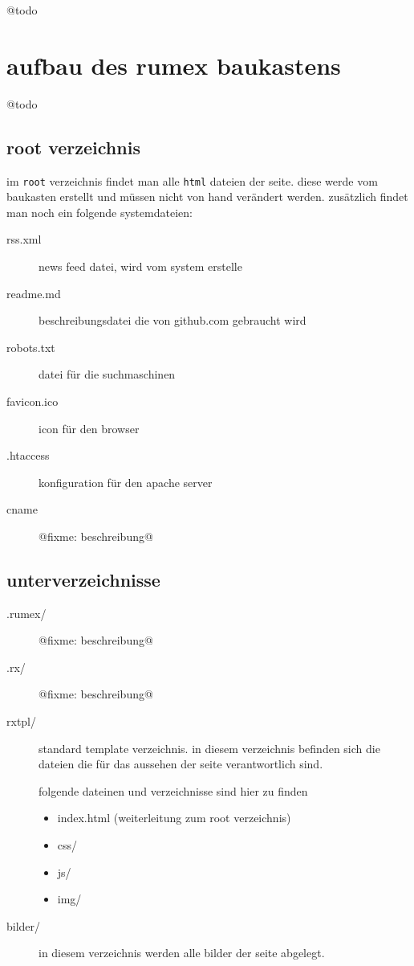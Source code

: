 @todo

\section{aufbau des rumex baukastens}\label{aufbau-des-rumex-baukastens}

@todo

\subsection{root verzeichnis}\label{root-verzeichnis}

im \texttt{root} verzeichnis findet man alle \texttt{html} dateien der
seite. diese werde vom baukasten erstellt und müssen nicht von hand
verändert werden. zusätzlich findet man noch ein folgende systemdateien:

\begin{description}
\item[rss.xml]
news feed datei, wird vom system erstelle
\item[readme.md]
beschreibungsdatei die von github.com gebraucht wird
\item[robots.txt]
datei für die suchmaschinen
\item[favicon.ico]
icon für den browser
\item[.htaccess]
konfiguration für den apache server
\item[cname]
@fixme: beschreibung@
\end{description}

\subsection{unterverzeichnisse}\label{unterverzeichnisse}

\begin{description}
\item[.rumex/]
@fixme: beschreibung@
\item[.rx/]
@fixme: beschreibung@
\item[rxtpl/]
standard template verzeichnis. in diesem verzeichnis befinden sich die
dateien die für das aussehen der seite verantwortlich sind.

folgende dateinen und verzeichnisse sind hier zu finden

\begin{itemize}
\itemsep1pt\parskip0pt
\item
  index.html (weiterleitung zum root verzeichnis)
\item
  css/\\
\item
  js/
\item
  img/
\end{itemize}
\item[bilder/]
in diesem verzeichnis werden alle bilder der seite abgelegt.
\end{description}

